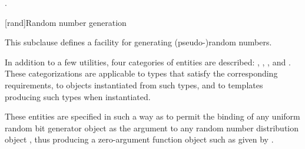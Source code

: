 \begin{itemdescr}
\pnum
\returns
{}.
\end{itemdescr}



[rand]{Random number generation}

%
%
%
%

\pnum
This subclause defines a facility
for generating (pseudo-)random numbers.

\pnum
In addition to a few utilities,
four categories of entities are described:
,
,
,
and
.
These categorizations are applicable
to types that satisfy the corresponding requirements,
to objects instantiated from such types,
and to templates producing such types when instantiated.
\begin{note}
 These entities are specified in such a way
 as to permit the binding
 of any uniform random bit generator object 
 as the argument
 to any random number distribution object ,
 thus producing a zero-argument function object
 such as given by
 .
\end{note}

